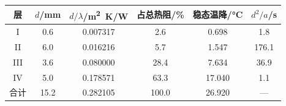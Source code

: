 \begin{tabular}{cccccc}
  \toprule
    层 & $d$/\si{mm} & $d/\lambda$/\si{m^2.K/W} & 占总热阻/\si{\percent} & 稳态温降/\si{\celsius} & $d^2/a$/\si{s} \\
  \midrule
    I & 0.6 & 0.007317 & 2.6 & 0.698 & 1.8 \\
    II & 6.0 & 0.016216 & 5.7 & 1.547 & 176.1 \\
    III & 3.6 & 0.080000 & 28.4 & 7.634 & 36.9 \\
    IV & 5.0 & 0.178571 & 63.3 & 17.040 & 1.1 \\
  \midrule
    合计 & 15.2 & 0.282105 & 100.0 & 26.920 & --- \\
  \bottomrule
\end{tabular}
